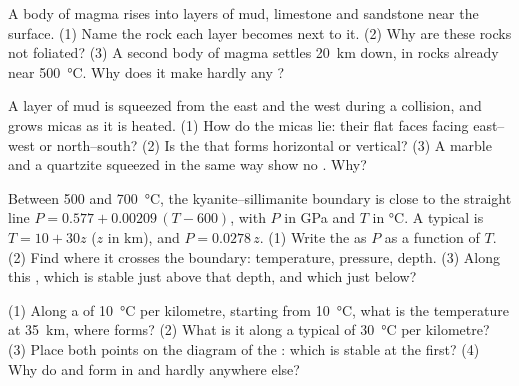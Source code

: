 \begin{exercise}[$\star\star$]\label{exo:g12:metamorphic-rocks:10}
A body of magma rises into layers of mud, limestone and sandstone near the
surface. (1) Name the rock each layer becomes next to it. (2) Why are these
rocks not foliated? (3) A second body of magma settles \qty{20}{km} down, in
rocks already near \qty{500}{\celsius}. Why does it make hardly any ?
\end{exercise}

\begin{exercise}[$\star\star$]\label{exo:g12:metamorphic-rocks:11}
A layer of mud is squeezed from the east and the west during a collision,
and grows micas as it is heated. (1) How do the micas lie: their flat faces
facing east--west or north--south? (2) Is the  that forms
horizontal or vertical? (3) A marble and a quartzite squeezed in the same
way show no . Why?
\end{exercise}

\begin{exercise}[$\star\star\star$]\label{exo:g12:metamorphic-rocks:12}
Between 500 and \qty{700}{\celsius}, the kyanite--sillimanite boundary is
close to the straight line $P = 0.577 + 0.00209\,(T - 600)$, with $P$ in
\unit{GPa} and $T$ in \unit{\celsius}. A typical  is $T = 10 + 30z$
($z$ in \unit{km}), and $P = 0.0278\,z$. (1) Write the  as $P$ as a
function of $T$. (2) Find where it crosses the boundary: temperature, pressure,
depth. (3) Along this , which  is stable just above that
depth, and which just below?
\end{exercise}

\begin{exercise}[$\star\star\star$]\label{exo:g12:metamorphic-rocks:13}
(1) Along a   of \qty{10}{\celsius} per kilometre, starting
from \qty{10}{\celsius}, what is the temperature at \qty{35}{km}, where
 forms? (2) What is it along a typical  of
\qty{30}{\celsius} per kilometre? (3) Place both points on the diagram of
the : which  is stable at the first? (4) Why do
 and  form in  and hardly anywhere else?
\end{exercise}

